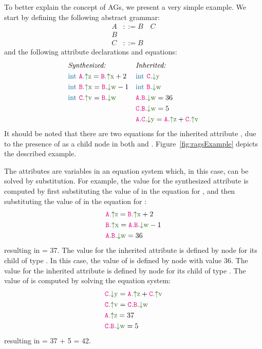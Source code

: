 To better explain the concept of AGs, we present a very simple example.
We start by defining the following abstract grammar:
    \begin{align*}
        A& ::= B \quad C \\
        B& \\
        C& ::= B
    \end{align*}
and the following attribute declarations and equations:
    \begin{align*}
        &\textit{Synthesized:}  && \textit{Inherited:} \\
        &\nativetype{int} \ \Asyn{A}{z} = \Asyn{B}{x} + 2  &&\nativetype{int} \ \Ainh{C}{y} \\
        &\nativetype{int} \ \Asyn{B}{x} = \Ainh{B}{w} -1   &&\nativetype{int} \ \Ainh{B}{w}  \\
       &\nativetype{int} \ \Asyn{C}{v} = \Ainh{B}{w}   & &\Ainhdef{A}{B}{w} = 36\\
        & && \Ainhdef{C}{B}{w} = 5\\
        &&& \Ainhdef{A}{C}{y} = \Asyn{A}{z} + \Asyn{C}{v} \\
    \end{align*}
It should be noted that there are two equations for the inherited attribute ,
due to the presence of  as a child node in both  and .
Figure~\ref{fig:ragsExample} depicts the described example.

The attributes are variables in an equation system which, in this case, can be solved by substitution.
For example, the value for the synthesized attribute  is computed by first
substituting the value of  in the equation for , and then
substituting the value of  in the equation for :
\begin{align*}
    &\Asyn{A}{z} = \Asyn{B}{x} + 2 \\
    &\Asyn{B}{x} = \Ainhdef{A}{B}{w} - 1 \\
    &\Ainhdef{A}{B}{w} = 36
\end{align*}
resulting in  = 37. The value for the inherited attribute  is defined by node  for
its child of type . In this case, the value of  is defined by node 
with value 36.
The value for the inherited attribute  is defined by node  for
its child of type . The value of  is computed by solving the equation system:
\begin{align*}
    &\Ainh{C}{y} = \Asyn{A}{z} + \Asyn{C}{v} \\
    &\Asyn{C}{v} = \Ainhdef{C}{B}{w}\\
    &\Asyn{A}{z} = 37 \\
    &\Ainhdef{C}{B}{w}  = 5
\end{align*}
resulting in  = 37 + 5 = 42.


